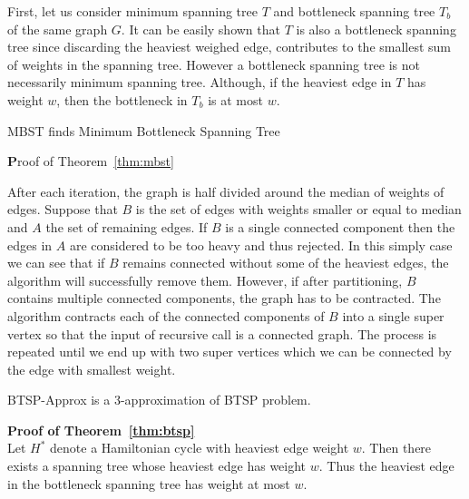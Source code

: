 \documentclass[runningheads, a4paper]{llncs}
\begin{document}
        First, let us consider minimum spanning tree $T$ and bottleneck spanning tree $T_{b}$ of the same graph $G$. It can be easily shown that $T$ is also a bottleneck spanning tree since discarding the heaviest weighed edge, contributes to the smallest sum of weights in the spanning tree. However a bottleneck spanning tree is not necessarily minimum spanning tree. Although, if the heaviest edge in $T$ has weight $w$, then the bottleneck in $T_{b}$ is at most $w$.
        
        \begin{theorem} \label{thm:mbst}
            MBST finds Minimum Bottleneck Spanning Tree
        \end{theorem}
        
        {\textbf Proof of Theorem~\ref{thm:mbst}}
        
        After each iteration, the graph is half divided around the median of weights of edges. Suppose that $B$ is the set of edges with weights smaller or equal to median and $A$ the set of remaining edges. If $B$ is a single connected component then the edges in $A$ are considered to be too heavy and thus rejected. In this simply case we can see that if $B$ remains connected without some of the heaviest edges, the algorithm will successfully remove them. However, if after partitioning, $B$ contains multiple connected components, the graph has to be contracted. The algorithm contracts each of the connected components of $B$ into a single super vertex so that the input of recursive call is a connected graph. The process is repeated until we end up with two super vertices which we can be connected by the edge with smallest weight.
        
        
        \begin{theorem} \label{thm:btsp}
            BTSP-Approx is a 3-approximation of BTSP problem.
        \end{theorem}
        
        \textbf {Proof of Theorem~\ref{thm:btsp}}\\
        
        
        Let $H^*$ denote a Hamiltonian cycle with heaviest edge weight $w$. Then there exists a spanning tree whose heaviest edge has weight $w$. Thus the heaviest edge in the bottleneck spanning tree has weight at most $w$.
        
        
\end{document}
